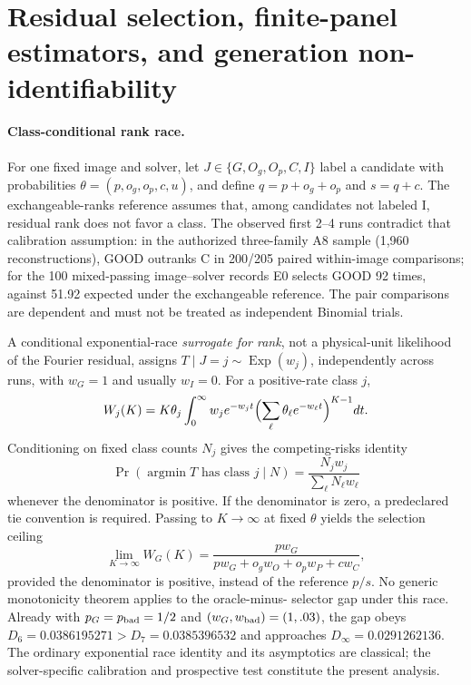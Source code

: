\section{Residual selection, finite-panel estimators, and generation non-identifiability}
\label{sec:suppl-selection}

\paragraph{Class-conditional rank race.}
For one fixed image and solver, let $J\in\{G,O_g,O_p,C,I\}$
label a candidate with probabilities
$\theta=(p,o_g,o_p,c,u)$, and define $q=p+o_g+o_p$ and $s=q+c$.
The exchangeable-ranks reference assumes that, among candidates not
labeled I, residual rank does not favor a class. The observed first
2--4 runs contradict that calibration assumption: in the authorized
three-family A8 sample (1,960 reconstructions), GOOD outranks C in
200/205 paired within-image comparisons; for the 100 mixed-passing
image--solver records E0 selects GOOD 92 times, against 51.92 expected
under the exchangeable reference. The pair comparisons are dependent
and must not be treated as independent Binomial trials.

A conditional exponential-race \emph{surrogate for rank}, not a
physical-unit likelihood of the Fourier residual, assigns
$T\mid J=j\sim\operatorname{Exp}(w_j)$, independently across
runs, with $w_G=1$ and usually $w_I=0$. For a positive-rate class $j$,
\begin{equation}\label{eq:suppl-race-integral}
 W_j(K)=K\theta_j\int_0^\infty w_j e^{-w_jt}
 \Bigl(\sum_{\ell}\theta_\ell e^{-w_\ell t}\Bigr)^{K-1}dt.
\end{equation}
Conditioning on fixed class counts $N_j$ gives the competing-risks
identity
\[
 \Pr(\operatorname*{argmin}T\text{ has class }j\mid N)
 =\frac{N_jw_j}{\sum_{\ell}N_\ell w_\ell}
\]
whenever the denominator is positive. If the denominator is zero, a
predeclared tie convention is required. Passing to $K\to\infty$ at
fixed $\theta$ yields the selection ceiling
\[
 \lim_{K\to\infty}W_G(K)=
 \frac{p w_G}{p w_G+o_gw_O+o_pw_P+cw_C},
\]
provided the denominator is positive, instead of the reference
$p/s$. No generic monotonicity theorem applies to the oracle-minus-
selector gap under this race. Already with $p_G=p_{\rm bad}=1/2$ and
$(w_G,w_{\rm bad})=(1,.03)$, the gap obeys
$D_6=0.0386195271>D_7=0.0385396532$ and approaches
$D_\infty=0.0291262136$. The ordinary exponential race identity
and its asymptotics are classical; the solver-specific calibration
and prospective test constitute the present analysis.

